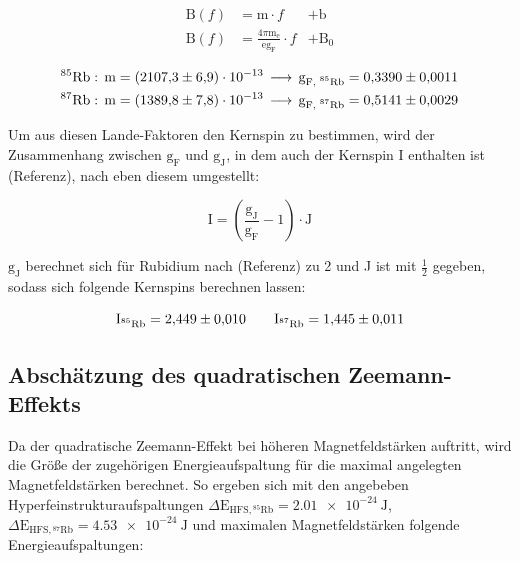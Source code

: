         \begin{align*}
            \text{B}(f) &= \text{m} \cdot f &+ \text{b}   \\
            \text{B}(f) &= \frac{4 \pi \text{m}_{\text{e}}}{\text{e} \text{g}_{\text{F}}} \cdot f &+ \text{B}_0 
        \end{align*}

        \begin{align*}
            \text{${}^{85}$Rb} &: \, \text{m} = \num{2107.3\pm6.9 e-13} \, \longrightarrow \, \text{g}_{\text{F, ${}^{85}$Rb}} = \num{0.3390 +- 0.0011} \\
            \text{${}^{87}$Rb} &: \, \text{m} = \num{1389.8\pm7.8 e-13} \, \longrightarrow \, \text{g}_{\text{F, ${}^{87}$Rb}} = \num{0.5141 +- 0.0029} 
        \end{align*}

        \noindent

        Um aus diesen Lande-Faktoren den Kernspin zu bestimmen, wird der Zusammenhang zwischen $\text{g}_{\text{F}}$ und $\text{g}_{\text{J}}$, in dem auch der Kernspin I enthalten ist (Referenz), nach 
        eben diesem umgestellt:
        
        \begin{equation*}
            \text{I} = \left( \frac{\text{g}_{\text{J}}}{\text{g}_{\text{F}}} - 1 \right) \cdot \text{J}
        \end{equation*}

        $\text{g}_{\text{J}}$ berechnet sich für Rubidium nach (Referenz) zu 2 und J ist mit $\frac{1}{2}$ gegeben, sodass sich folgende Kernspins berechnen lassen:

        \begin{equation*}
            \text{I}_{\text{${}^{85}$Rb}} = \num{2.449 +- 0.010} \qquad \text{I}_{\text{${}^{87}$Rb}} = \num{1.445 +- 0.011}
        \end{equation*}

        

    \subsection{Abschätzung des quadratischen Zeemann-Effekts}
        Da der quadratische Zeemann-Effekt bei höheren Magnetfeldstärken auftritt, wird die Größe der zugehörigen Energieaufspaltung für die maximal angelegten Magnetfeldstärken berechnet. So ergeben sich mit 
        den angebeben Hyperfeinstrukturaufspaltungen $\Delta\text{E}_{\text{HFS}, {}^{85}\text{Rb}} =  \SI{2.01 e-24}{\joule}$, $\Delta\text{E}_{\text{HFS}, {}^{87}\text{Rb}} = \SI{4.53 e-24}{\joule}$ und 
        maximalen Magnetfeldstärken folgende Energieaufspaltungen:

